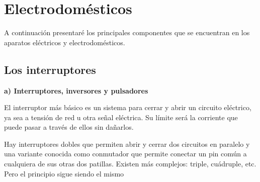 \documentclass[a5paper,twoside,openany]{book}
\begin{document}
\chapter{Electrodomésticos}
A continuación presentaré los principales componentes que se encuentran en los aparatos eléctricos y electrodomésticos.

\section{Los interruptores}
{\large \textbf{a) Interruptores, inversores y pulsadores}}\\

\noindent\begin{minipage}[t]{0.35\textwidth}\vspace{0pt}

El interruptor más básico es un sistema para cerrar y abrir un
circuito eléctrico, ya sea a tensión de red u otra señal eléctrica.
Su límite será la corriente que puede pasar a través de ellos sin
dañarlos.\\

\begin{flushleft}
Hay interruptores dobles que permiten abrir y cerrar dos circuitos
en paralelo y una variante conocida como conmutador que permite conectar un pin común a
cualquiera de sus otras dos patillas. Existen más complejos: triple,
cuádruple, etc. Pero el principio sigue siendo el mismo
\end{flushleft}
\end{minipage}%
\hfill%
\end{document}
